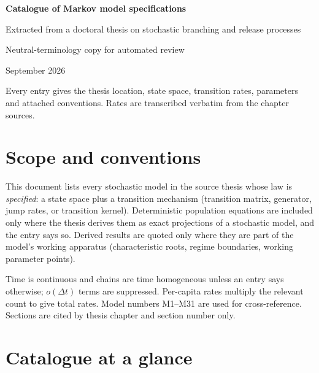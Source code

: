 \documentclass[11pt,a4paper]{report}
\begin{document}
\begin{titlepage}
\centering
\vspace*{4.2cm}
{\LARGE\bfseries Catalogue of Markov model specifications\par}
\vspace{10pt}
{\large Extracted from a doctoral thesis on stochastic branching and release
processes\par}
\vspace{1.6cm}
{\large Neutral-terminology copy for automated review\par}
\vspace{6pt}
{September 2026\par}
\vfill
{\small Every entry gives the thesis location, state space, transition rates,
parameters and attached conventions. Rates are transcribed verbatim from the
chapter sources.\par}
\vspace*{1.2cm}
\end{titlepage}

\tableofcontents
\clearpage

\chapter*{Scope and conventions}

This document lists every stochastic model in the source thesis whose law is
\emph{specified}: a state space plus a transition mechanism (transition
matrix, generator, jump rates, or transition kernel). Deterministic
population equations are included only where the thesis derives them as
exact projections of a stochastic model, and the entry says so. Derived
results are quoted only where they are part of the model's working
apparatus (characteristic roots, regime boundaries, working parameter
points).

Time is continuous and chains are time homogeneous unless an entry says
otherwise; $o(\Delta t)$ terms are suppressed. Per-capita rates multiply the
relevant count to give total rates. Model numbers M1--M31 are used for
cross-reference. Sections are cited by thesis chapter and section number
only.

\chapter{Catalogue at a glance}
\end{document}
